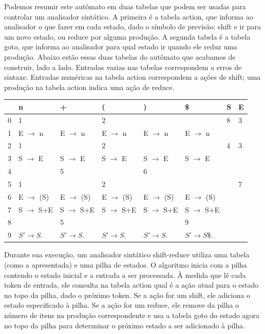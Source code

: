 Podemos resumir este autômato em duas tabelas que podem ser usadas
para controlar um analisador sintático. A primeira é a tabela action,
que informa ao analisador o que fazer em cada estado, dado o símbolo
de previsão: shift e ir para um novo estado, ou reduce por alguma
produção. A segunda tabela é a tabela goto, que informa ao analisador
para qual estado ir quando ele reduz uma produção. Abaixo estão essas
duas tabelas do autômato que acabamos de construir, lado a lado.
Entradas vazias nas tabelas correspondem a erros de sintaxe. Entradas
numéricas na tabela action correspondem a ações de shift; uma
produção na tabela action indica uma ação de reduce.

\begin{table}[H]
  \begin{tabular}{@{}llllllll@{}}
    \toprule
    & n & + & ( & ) & \$ & S & E \\
    \midrule
    0 & 1 & & 2 & & & 8 & 3 \\
    1 & E $\to$ n & E $\to$ n & E $\to$ n & E $\to$ n & E $\to$ n & & \\
    2 & 1 & & 2 & & & 4 & 3 \\
    3 & S $\to$ E & S $\to$ E & S $\to$ E & S $\to$ E & S $\to$ E & & \\
    4 & & 5 & & 6 & & & \\
    5 & 1 & & 2 & & & & 7 \\
    6 & E $\to$ (S) & E $\to$ (S) & E $\to$ (S) & E $\to$ (S) & E
    $\to$ (S) & & \\
    7 & S $\to$ S+E & S $\to$ S+E & S $\to$ S+E & S $\to$ S+E & S
    $\to$ S+E & & \\
    8 & & 5 & & & 9 & & \\
    9 & \(S'\to S\). & \(S' \to S\). & \(S'\to S\). & \(S' \to S\). & \(S'\to
    S\$\). & & \\
    \bottomrule
  \end{tabular}
  \centering
\end{table}

Durante sua execução, um analisador sintático shift-reduce utiliza
uma tabela (como a apresentada) e uma pilha de estados. O algoritmo
inicia com a pilha contendo o estado inicial e a entrada a ser
processada. À medida que lê cada token de entrada, ele consulta na
tabela action qual é a ação atual para o estado no topo da pilha,
dado o próximo token. Se a ação for um shift, ele adiciona o estado
especificado à pilha. Se a ação for um reduce, ele remove da pilha o
número de itens na produção correspondente e usa a tabela goto do
estado agora no topo da pilha para determinar o próximo estado a ser
adicionado à pilha.

